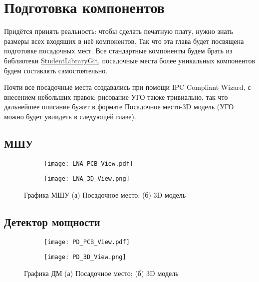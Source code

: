 \chapter{Подготовка компонентов} \label{chap:altium-components}

Придётся принять реальность: чтобы сделать печатную плату, нужно знать размеры всех входящих в неё компонентов. Так что эта глава будет посвящена подготовке посадочных мест. 
Все стандартные компоненты будем брать из библиотеки \href{https://github.com/dee3mon/StudentsLibraryGIT}{StudentLibraryGit}, посадочные места более уникальных компонентов будем составлять самостоятельно. 

Почти все посадочные места создавались при помощи IPC Compliant Wizard, с внесением небольших правок; рисование УГО также тривиально, так что дальнейшее описание бужет в формате Посадочное место-3D модель (УГО можно будет увиидеть в следующей главе).

\section{МШУ}

\begin{figure}[H]
	\centering

	\begin{subfigure}[b]{0.45\textwidth}
		\centering
		\texttt{[image: LNA\_PCB\_View.pdf]}
		\caption{}%
		\label{fig:LNA_PCB_View}
	\end{subfigure}
	\hfill
	\begin{subfigure}[b]{0.45\textwidth}
		\centering
		\texttt{[image: LNA\_3D\_View.png]}
		\caption{}%
		\label{fig:LNA_3D_View}
	\end{subfigure}
	\caption{%
		Графика МШУ
		(а) Посадочное место;
		(б) 3D модель
	}%
	\label{fig:LNA_footprint}
\end{figure}

\section{Детектор мощности}

\begin{figure}[H]
	\centering
	\begin{subfigure}[b]{0.45\textwidth}
		\centering
		\texttt{[image: PD\_PCB\_View.pdf]}
		\caption{}%
		\label{fig:PD_PCB_View}
	\end{subfigure}
	\hfill
	\begin{subfigure}[b]{0.45\textwidth}
		\centering
		\texttt{[image: PD\_3D\_View.png]}
		\caption{}%
		\label{fig:PD_3D_View}
	\end{subfigure}
	\caption{%
		Графика ДМ
		(а) Посадочное место;
		(б) 3D модель
	}%
	\label{fig:PD_footprint}
\end{figure}

